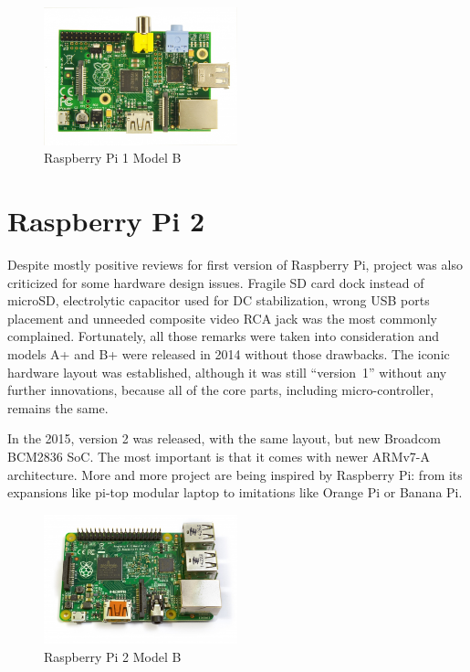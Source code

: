 \documentclass[printmode]{mgr}
\begin{document}
\begin{figure}[htbp]
  \centering
    \includegraphics[width=0.5\textwidth]{raspberrypi-front.jpg}
  \caption{Raspberry Pi 1 Model B}
  \label{fig:devboard-raspberrypi}
\end{figure}


\section{Raspberry Pi 2}

Despite mostly positive reviews for first version of Raspberry Pi, project was also criticized for some hardware design issues.
Fragile SD card dock instead of microSD, electrolytic capacitor used for DC stabilization, wrong USB ports placement and unneeded composite video RCA jack was the most commonly complained.\cite{web:raspberrypi-issues}
Fortunately, all those remarks were taken into consideration and models A+ and B+ were released in 2014 without those drawbacks.
The iconic hardware layout was established, although it was still ``version~1'' without any further innovations, because all of the core parts, including micro-controller, remains the same.

In the 2015, version 2 was released, with the same layout, but new Broadcom BCM2836 SoC.
The most important is that it comes with newer ARMv7-A architecture.
More and more project are being inspired by Raspberry Pi: from its expansions like pi-top modular laptop to imitations like Orange Pi or Banana Pi.\cite{web:pi-top}


\begin{figure}[htbp]
  \centering
    \includegraphics[width=0.5\textwidth]{raspberrypi2-front.jpg}
  \caption{Raspberry Pi 2 Model B}
  \label{fig:devboard-raspberrypi2}
\end{figure}
\end{document}
